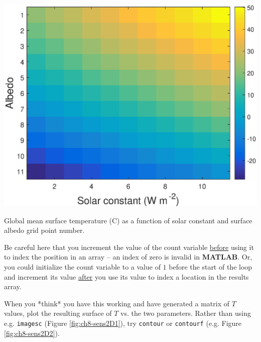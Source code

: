 \documentclass{tufte-book} %
\begin{document}
\begin{marginfigure}[-0.0in]
\includegraphics[width=\linewidth]{ch8-sens2D1.eps}
\caption{Global mean surface temperature (\degree C) as a function of solar constant and surface albedo grid point number.}
\label{fig:ch8-sens2D2}
\end{marginfigure}

Be careful here that you increment the value of the count variable \uline{before} using it to index the position in an array -- an index of zero is invalid in \textbf{MATLAB}. Or, you could initialize the count variable to a value of \(1\) before the start of the loop and increment its value \uline{after} you use its value to index a location in the results array.

When you *think* you have this working and have generated a matrix of \(T\) values, plot the resulting surface of \(T\) vs. the two parameters. Rather than using e.g. \texttt{imagesc} (Figure \ref{fig:ch8-sens2D1}),  try \texttt{contour} or \texttt{contourf} (e.g. Figure \ref{fig:ch8-sens2D2}).
\end{document}

